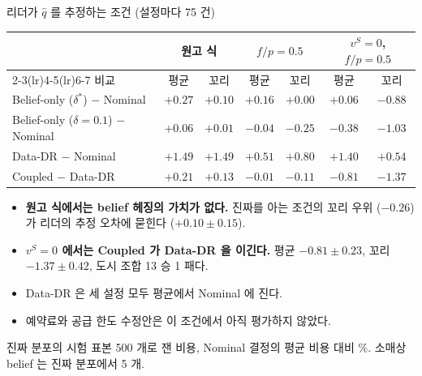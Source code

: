 \documentclass[aspectratio=169,11pt]{beamer}
\begin{document}
\begin{frame}{리더가 $\hat q$ 를 추정하는 조건 (설정마다 75 건)}
\begin{center}
\footnotesize
\begin{tabular}{lcccccc}
\toprule
 & \multicolumn{2}{c}{원고 식} & \multicolumn{2}{c}{$f/p = 0.5$} & \multicolumn{2}{c}{$v^{S} = 0$, $f/p = 0.5$}\\
\cmidrule(lr){2-3}\cmidrule(lr){4-5}\cmidrule(lr){6-7}
비교 & 평균 & 꼬리 & 평균 & 꼬리 & 평균 & 꼬리\\
\midrule
Belief-only ($\delta^{*}$) $-$ Nominal & $+0.27$ & $+0.10$ & $+0.16$ & $+0.00$ & $+0.06$ & $-0.88$\\
Belief-only ($\delta = 0.1$) $-$ Nominal & $+0.06$ & $+0.01$ & $-0.04$ & $-0.25$ & $-0.38$ & $-1.03$\\
Data-DR $-$ Nominal & $+1.49$ & $+1.49$ & $+0.51$ & $+0.80$ & $+1.40$ & $+0.54$\\
Coupled $-$ Data-DR & $+0.21$ & $+0.13$ & $-0.01$ & $-0.11$ & $-0.81$ & $-1.37$\\
\bottomrule
\end{tabular}
\end{center}
\begin{itemize}
  \item \textbf{원고 식에서는 belief 헤징의 가치가 없다.} 진짜를 아는 조건의 꼬리 우위 ($-0.26$) 가 리더의 추정 오차에 묻힌다 ($+0.10 \pm 0.15$).
  \item \textbf{$v^{S} = 0$ 에서는 Coupled 가 Data-DR 을 이긴다.} 평균 $-0.81 \pm 0.23$, 꼬리 $-1.37 \pm 0.42$, 도시 조합 13 승 1 패다.
  \item Data-DR 은 세 설정 모두 평균에서 Nominal 에 진다.
  \item 예약료와 공급 한도 수정안은 이 조건에서 아직 평가하지 않았다.
\end{itemize}
{\footnotesize 진짜 분포의 시험 표본 500 개로 잰 비용, Nominal 결정의 평균 비용 대비 \%. 소매상 belief 는 진짜 분포에서 5 개.}
\end{frame}
\end{document}
